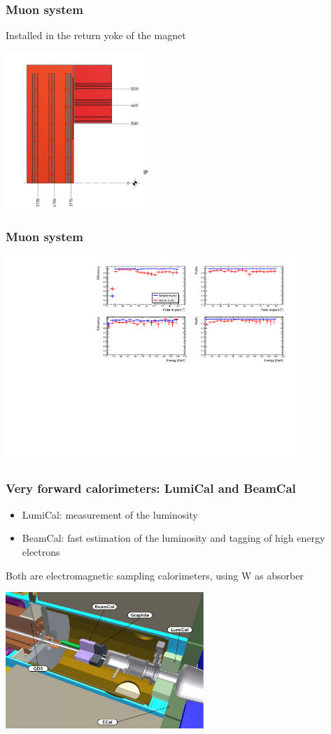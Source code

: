 \documentclass{beamer}
\begin{document}
\begin{frame}
\frametitle{Muon system}
Installed in the return yoke of the magnet
\begin{center}
\includegraphics[width=5.5cm]{MS_SiD_HG.pdf}
\end{center}
\end{frame}
\begin{frame}
\frametitle{Muon system}
\begin{center}
\includegraphics[width=11cm]{effPur_MuonsInZbb_and_muonGunE150pm150_defaultCuts.pdf}
\end{center}
\end{frame}

\begin{frame}
\frametitle{Very forward calorimeters: LumiCal and BeamCal}
\begin{itemize}
  \item LumiCal: measurement of the luminosity
  \item BeamCal: fast estimation of the luminosity and tagging of high energy
  electrons
\end{itemize}
Both are electromagnetic sampling calorimeters, using W as absorber
\begin{center}
\includegraphics[width=7.5cm]{MDI_layout_v3.pdf}
\end{center}
\end{frame}
\end{document}
